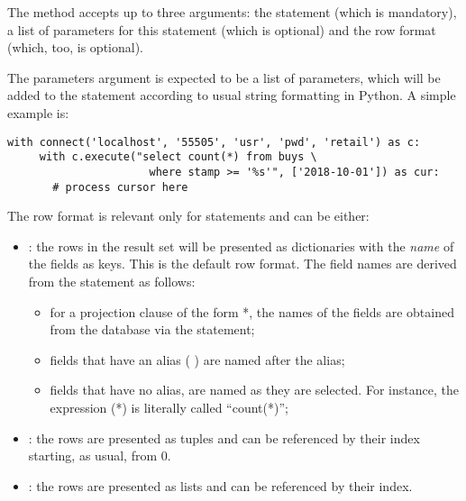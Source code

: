 The  method accepts up to three arguments:
the statement (which is mandatory), a list of parameters for this
statement (which is optional) and the row format (which, too,
is optional).

The parameters argument is expected to be a list of parameters,
which will be added to the statement according
to usual string formatting in Python.
A simple example is:

\begin{python}
\begin{lstlisting}
with connect('localhost', '55505', 'usr', 'pwd', 'retail') as c:
     with c.execute("select count(*) from buys \
                      where stamp >= '%s'", ['2018-10-01']) as cur:
       # process cursor here
\end{lstlisting}
\end{python}

The row format is relevant only for 
statements and can be either:

\begin{itemize}
\item {}: 
      the rows in the result set will be presented as dictionaries
      with the \emph{name} of the fields as keys.
      This is the default row format.
      The field names are derived from the statement as follows:
      \begin{itemize}
      \item for a projection clause of the form  *,
            the names of the fields are obtained from the database via
            the \term{describe} statement;
      \item fields that have an alias
            (   )
            are named after the alias;
      \item fields that have no alias, are named as they are selected.
            For instance, the expression \keyword{count}(*) is
            literally called ``count(*)''; 
      \end{itemize}
\item {}:
      the rows are presented as tuples and can be referenced by their index
      starting, as usual, from 0.
\item {}:
      the rows are presented as lists and can be referenced by their index.
\end{itemize}

